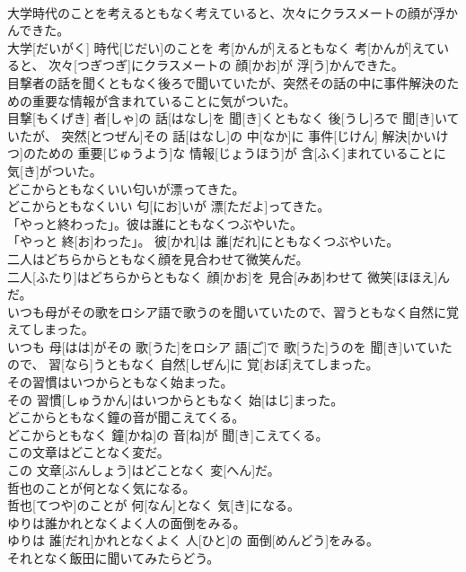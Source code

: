 \documentclass[8pt]{extreport}
\begin{document}
\begin{CJK}{UTF8}{min}
\\	大学時代のことを考えるともなく考えていると、次々にクラスメートの顔が浮かんできた。	
\\	大学[だいがく] 時代[じだい]のことを 考[かんが]えるともなく 考[かんが]えていると、 次々[つぎつぎ]にクラスメートの 顔[かお]が 浮[う]かんできた。
\\	目撃者の話を聞くともなく後ろで聞いていたが、突然その話の中に事件解決のための重要な情報が含まれていることに気がついた。	
\\	目撃[もくげき] 者[しゃ]の 話[はなし]を 聞[き]くともなく 後[うし]ろで 聞[き]いていたが、 突然[とつぜん]その 話[はなし]の 中[なか]に 事件[じけん] 解決[かいけつ]のための 重要[じゅうよう]な 情報[じょうほう]が 含[ふく]まれていることに 気[き]がついた。
\\	どこからともなくいい匂いが漂ってきた。	
\\	どこからともなくいい 匂[にお]いが 漂[ただよ]ってきた。
\\	「やっと終わった」。彼は誰にともなくつぶやいた。	
\\	「やっと 終[お]わった」。 彼[かれ]は 誰[だれ]にともなくつぶやいた。
\\	二人はどちらからともなく顔を見合わせて微笑んだ。	
\\	二人[ふたり]はどちらからともなく 顔[かお]を 見合[みあ]わせて 微笑[ほほえ]んだ。
\\	いつも母がその歌をロシア語で歌うのを聞いていたので、習うともなく自然に覚えてしまった。	
\\	いつも 母[はは]がその 歌[うた]をロシア 語[ご]で 歌[うた]うのを 聞[き]いていたので、 習[なら]うともなく 自然[しぜん]に 覚[おぼ]えてしまった。
\\	その習慣はいつからともなく始まった。	
\\	その 習慣[しゅうかん]はいつからともなく 始[はじ]まった。
\\	どこからともなく鐘の音が聞こえてくる。	
\\	どこからともなく 鐘[かね]の 音[ね]が 聞[き]こえてくる。
\\	この文章はどことなく変だ。	
\\	この 文章[ぶんしょう]はどことなく 変[へん]だ。
\\	哲也のことが何となく気になる。	
\\	哲也[てつや]のことが 何[なん]となく 気[き]になる。
\\	ゆりは誰かれとなくよく人の面倒をみる。	
\\	ゆりは 誰[だれ]かれとなくよく 人[ひと]の 面倒[めんどう]をみる。
\\	それとなく飯田に聞いてみたらどう。	

\end{CJK}
\end{document}
